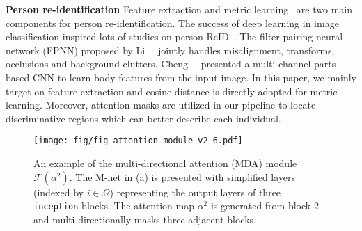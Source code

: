 \documentclass[10pt,twocolumn,letterpaper]{article}
\begin{document}
\noindent \textbf{Person re-identification}
Feature extraction and metric learning~\cite{koestinger2012large,liao2015person} are two main components for person re-identification.
The success of deep learning in image classification inspired lots of studies on person ReID~\cite{cheng2016person, li2014deepreid, xiao2016learning, wu2016personnet, varior2016gated, su2016deep, ustinova2015multiregion, li2017person, xiao2017joint}.
The filter pairing neural network (FPNN) proposed by Li~\etal~\cite{li2014deepreid} jointly handles misalignment, transforms, occlusions and background clutters.
Cheng~\etal~\cite{cheng2016person} presented a multi-channel parts-based CNN to learn body features from the input image.
In this paper, we mainly target on feature extraction and cosine distance is directly adopted for metric learning.
Moreover, attention masks are utilized in our pipeline to locate discriminative regions which can better describe each individual.













\begin{figure}[t]
\centering
\texttt{[image: fig/fig\_attention\_module\_v2\_6.pdf]}
\caption{An example of the multi-directional attention (MDA) module $\mathcal{F}(\alpha^2)$. The M-net in (a) is presented with simplified layers (indexed by $i\in\Omega$) representing the output layers of three \texttt{inception} blocks. The attention map $\alpha^2$ is generated from block $2$ and multi-directionally masks three adjacent blocks.
}
\label{fig:attention_module}
\end{figure}



\end{document}
